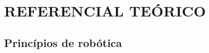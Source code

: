 \chapter{REFERENCIAL TEÓRICO}
\label{chap:refer}

\section{Princípios de robótica}
\label{sec:princ}


